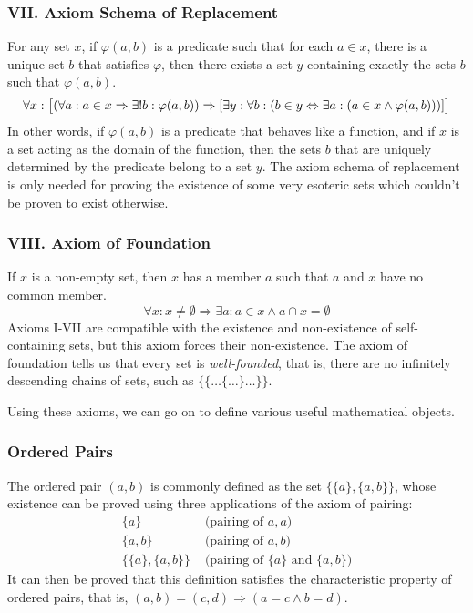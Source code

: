 \documentclass[11pt]{report}
\theoremstyle{definition}
\theoremstyle{theorem}
\theoremstyle{lemma}
\begin{document}
\subsubsection*{VII. Axiom Schema of Replacement}
For any set $x$, if $\varphi(a,b)$ is a predicate such that for each $a\in x$, there is a unique set $b$ that satisfies $\varphi$, then there exists a set $y$ containing exactly the sets $b$ such that $\varphi(a,b)$.
$$\forall x: \big{[}(\forall a: a\in x \Rightarrow \exists! b: \varphi(a,b))
  \Rightarrow [\exists y: \forall b: (b \in y \Leftrightarrow \exists a: (a\in x \wedge \varphi(a,b)))]\big{]}$$
In other words, if $\varphi(a,b)$ is a predicate that behaves like a function, and if $x$ is a set acting as the domain of the function, then the sets $b$ that are uniquely determined by the predicate belong to a set $y$.
The axiom schema of replacement is only needed for proving the existence of some very esoteric sets which couldn't be proven to exist otherwise. 

\subsubsection*{VIII. Axiom of Foundation}
If $x$ is a non-empty set, then $x$ has a member $a$ such that $a$ and $x$ have no common member.
$$\forall x: x \neq \emptyset \Rightarrow \exists a: a\in x \wedge a \cap x = \emptyset$$
Axioms I-VII are compatible with the existence and non-existence of self-containing sets, but this axiom forces their non-existence. The axiom of foundation tells us that every set is \emph{well-founded}, that is, there are no infinitely descending chains of sets, such as $\{\{\ldots\{\ldots\}\ldots\}\}$.

Using these axioms, we can go on to define various useful mathematical objects.

\subsubsection*{Ordered Pairs}
\label{zfordpair}
The ordered pair $(a,b)$ is commonly defined as the set $\{\{a\},\{a,b\}\}$, whose existence can be proved using three applications of the axiom of pairing:
\begin{align*}
  \{a\} & \text{  (pairing of $a,a$)} \\
  \{a,b\} & \text{  (pairing of $a,b$)} \\
  \{\{a\}, \{a,b\}\} & \text{  (pairing of $\{a\}$ and $\{a,b\}$)}
\end{align*}
It can then be proved that this definition satisfies the characteristic property of ordered pairs, that is, $(a,b) = (c,d) \Rightarrow (a=c \wedge b=d)$.
\end{document}
